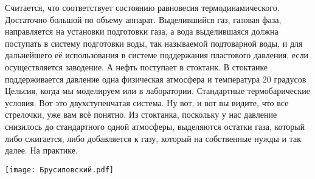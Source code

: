 \documentclass[main.tex]{subfiles}
\begin{document}
Считается, что соответствует состоянию равновесия термодинамического.
Достаточно большой по объему аппарат.
Выделившийся газ, газовая фаза, направляется на установки подготовки газа, а вода выделившаяся должна поступать в систему подготовки воды, так называемой подтоварной воды, и для дальнейшего её использования в системе поддержания пластового давления, если осуществляется заводение.
А нефть поступает в стоктанк.
В стоктанке поддерживается давление одна физическая атмосфера и температура 20 градусов Цельсия, когда мы моделируем или в лаборатории.
Стандартные термобарические условия.
Вот это двухступенчатая система.
Ну вот, и вот вы видите, что все стрелочки, уже вам всё понятно.
Из стоктанка, поскольку у нас давление снизилось до стандартного одной атмосферы, выделяются остатки газа, который либо сжигается, либо добавляется к газу, который на собственные нужды и так далее.
На практике.

\begin{center}
\texttt{[image: Брусиловский.pdf]}
\end{center}
\end{document}
